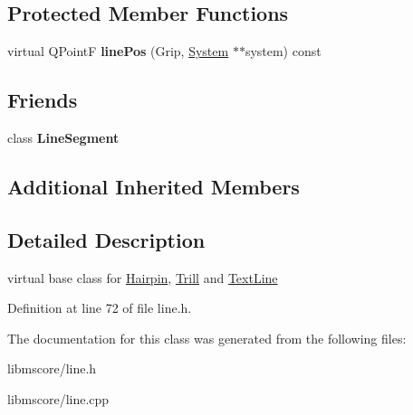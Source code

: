 \subsection*{Protected Member Functions}
\begin{DoxyCompactItemize}
\item 
\mbox{\label{class_ms_1_1_s_line_aeda6190f5593386166812c73988a5b5b}} 
virtual Q\+PointF {\bfseries line\+Pos} (Grip, \hyperlink{class_ms_1_1_system}{System} $\ast$$\ast$system) const
\end{DoxyCompactItemize}
\subsection*{Friends}
\begin{DoxyCompactItemize}
\item 
\mbox{\label{class_ms_1_1_s_line_a5b11da316db915ad5bd01aa879d20bbf}} 
class {\bfseries Line\+Segment}
\end{DoxyCompactItemize}
\subsection*{Additional Inherited Members}


\subsection{Detailed Description}
virtual base class for \hyperlink{class_ms_1_1_hairpin}{Hairpin}, \hyperlink{class_ms_1_1_trill}{Trill} and \hyperlink{class_ms_1_1_text_line}{Text\+Line} 

Definition at line 72 of file line.\+h.



The documentation for this class was generated from the following files\+:\begin{DoxyCompactItemize}
\item 
libmscore/line.\+h\item 
libmscore/line.\+cpp\end{DoxyCompactItemize}
